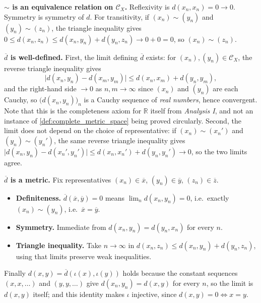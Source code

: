 \begin{exercisesolution}
\label{sol:completion_well_defined}
\textbf{$\sim$ is an equivalence relation on $\mathcal{C}_X$.} Reflexivity is
$d(x_n,x_n) = 0 \to 0$. Symmetry is symmetry of $d$. For transitivity, if
$(x_n)\sim(y_n)$ and $(y_n)\sim(z_n)$, the triangle inequality gives
$0 \leq d(x_n,z_n) \leq d(x_n,y_n)+d(y_n,z_n) \to 0+0 = 0$, so $(x_n)\sim(z_n)$.

\textbf{$\overline d$ is well-defined.} First, the limit defining $\overline d$ exists: for
$(x_n),(y_n) \in \mathcal{C}_X$, the reverse triangle inequality gives
\[\big|d(x_n,y_n) - d(x_m,y_m)\big| \leq d(x_n,x_m) + d(y_n,y_m),\]
and the right-hand side $\to 0$ as $n,m\to\infty$ since $(x_n)$ and $(y_n)$ are each Cauchy, so
$\big(d(x_n,y_n)\big)_n$ is a Cauchy sequence of \emph{real numbers}, hence convergent. Note that
this is the completeness axiom for $\mathbb{R}$ itself from \emph{Analysis I}, and not an instance
of \cref{def:complete_metric_space} being proved circularly. Second, the limit
does not depend on the choice of representative: if $(x_n)\sim(x_n')$ and $(y_n)\sim(y_n')$, the
same reverse triangle inequality gives
$\big|d(x_n,y_n)-d(x_n',y_n')\big| \leq d(x_n,x_n')+d(y_n,y_n') \to 0$, so the two limits agree.

\textbf{$\overline d$ is a metric.} Fix representatives $(x_n)\in\overline x$, $(y_n)\in\overline
y$, $(z_n)\in\overline z$.
\begin{itemize}
  \item \textbf{Definiteness.} $\overline d(\overline x,\overline y) = 0$ means
    $\lim_n d(x_n,y_n) = 0$, i.e.\ exactly $(x_n)\sim(y_n)$, i.e.\ $\overline x = \overline y$.
  \item \textbf{Symmetry.} Immediate from $d(x_n,y_n)=d(y_n,x_n)$ for every $n$.
  \item \textbf{Triangle inequality.} Take $n\to\infty$ in
    $d(x_n,z_n) \leq d(x_n,y_n) + d(y_n,z_n)$, using that limits preserve weak inequalities.
\end{itemize}
Finally $d(x,y) = \overline d(\iota(x),\iota(y))$ holds because the constant sequences
$(x,x,\dots)$ and $(y,y,\dots)$ give $d(x_n,y_n) = d(x,y)$ for every $n$, so the limit is
$d(x,y)$ itself; and this identity makes $\iota$ injective, since $d(x,y)=0 \iff x=y$.
\end{exercisesolution}


